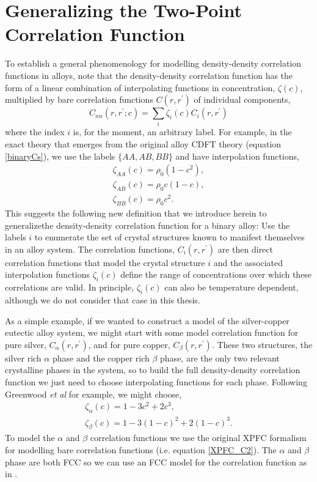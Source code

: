 \section{Generalizing the Two-Point Correlation Function} %

To establish a general phenomenology for modelling density-density correlation
functions in alloys, note that the density-density correlation function has the
form of a linear combination of interpolating functions in concentration,
$\zeta(c)$, multiplied by bare correlation functions $C(r, r^\prime)$ of
individual components,
%
\begin{equation}
    C_{nn}(r, r^\prime; c) = \sum_i \zeta_i(c) C_i(r, r^\prime)
\end{equation}
%
where the index $i$ is, for the moment, an arbitrary label. For example, in the
exact theory that emerges from the original alloy CDFT theory (equation
\ref{binaryCs}), we use the labels $\lbrace AA, AB, BB\rbrace$ and have
interpolation functions,
%
\begin{gather}
    \zeta_{AA}(c) = \rho_0 (1 - c^2), \\
    \zeta_{AB}(c) = \rho_0 c (1 - c ), \\
    \zeta_{BB}(c) = \rho_0 c^2.
\end{gather}
%
This suggests the following new definition that we introduce herein to
generalizethe density-density correlation function for a binary alloy: Use the
labels $i$ to enumerate the set of crystal structures known to manifest
themselves in an alloy system. The correlation functions, $C_i(r, r^\prime)$
are then direct correlation functions that model the crystal structure $i$ and
the associated interpolation functions $\zeta_i(c)$ define the range of
concentrations over which these correlations are valid. In principle,
$\zeta_i(c)$ can also be temperature dependent, although we do not consider
that case in this thesis.

As a simple example, if we wanted to construct a model of the silver-copper
eutectic alloy system, we might start with some model correlation function for
pure silver, $C_\alpha(r, r^\prime)$, and for pure copper, $C_\beta(r,
r^\prime)$. These two structures, the silver rich $\alpha$ phase and the copper
rich $\beta$ phase, are the only two relevant crystalline phases in the system,
so to build the full density-density correlation function we just need to
choose interpolating functions for each phase. Following Greenwood \textit{et
al} for example, we might choose,
%
\begin{gather}
    \zeta_\alpha(c) = 1 - 3c^2 + 2c^3, \\
    \zeta_\beta(c) = 1 - 3 (1 - c)^2 + 2(1 - c)^3.
\end{gather}
%
To model the $\alpha$ and $\beta$ correlation functions we use the original
XPFC formalism for modelling bare correlation functions (i.e. equation
\ref{XPFC_C2}). The $\alpha$ and $\beta$ phase are both FCC
\cite{SUBRAMANIAN93} so we can use an FCC model for the correlation function as
in \cite{GREENWOOD10}.


